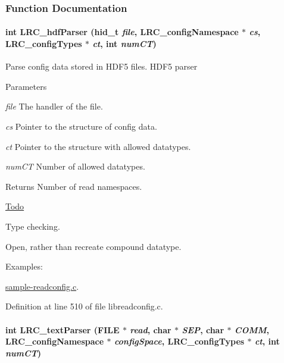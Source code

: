 \subsubsection{Function Documentation}
\hypertarget{group___l_r_c__parser_ga3cbf6e172a98da00ec8fd0b301b4b8f9}{
\paragraph[{LRC\_\-hdfParser}]{\setlength{\rightskip}{0pt plus 5cm}int LRC\_\-hdfParser (hid\_\-t {\em file}, \/  {\bf LRC\_\-configNamespace} $\ast$ {\em cs}, \/  {\bf LRC\_\-configTypes} $\ast$ {\em ct}, \/  int {\em numCT})}\hfill}
\label{group___l_r_c__parser_ga3cbf6e172a98da00ec8fd0b301b4b8f9}


Parse config data stored in HDF5 files. HDF5 parser


\begin{DoxyParams}{Parameters}
\item[{\em file}]The handler of the file.\item[{\em cs}]Pointer to the structure of config data.\item[{\em ct}]Pointer to the structure with allowed datatypes.\item[{\em numCT}]Number of allowed datatypes.\end{DoxyParams}
\begin{DoxyReturn}{Returns}
Number of read namespaces.
\end{DoxyReturn}
\begin{Desc}
\item[\hyperlink{todo__todo000005}{Todo}]
\begin{DoxyItemize}
\item Type checking.
\item Open, rather than recreate compound datatype.
\end{DoxyItemize}\end{Desc}
\begin{Desc}
\item[Examples: ]\par
\hyperlink{sample-readconfig_8c-example}{sample-\/readconfig.c}.\end{Desc}


Definition at line 510 of file libreadconfig.c.\hypertarget{group___l_r_c__parser_ga4b1c98d54591fd4d05cc1caee09cbd35}{
\paragraph[{LRC\_\-textParser}]{\setlength{\rightskip}{0pt plus 5cm}int LRC\_\-textParser (FILE $\ast$ {\em read}, \/  char $\ast$ {\em SEP}, \/  char $\ast$ {\em COMM}, \/  {\bf LRC\_\-configNamespace} $\ast$ {\em configSpace}, \/  {\bf LRC\_\-configTypes} $\ast$ {\em ct}, \/  int {\em numCT})}\hfill}
\label{group___l_r_c__parser_ga4b1c98d54591fd4d05cc1caee09cbd35}


